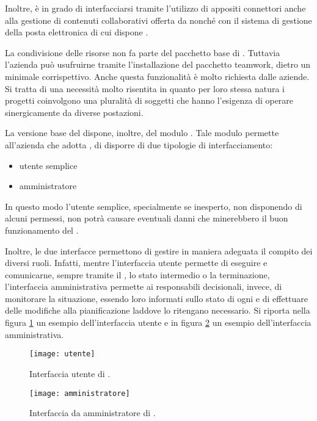 Inoltre, \progname è in grado di interfacciarsi tramite l'utilizzo di appositi connettori anche alla gestione di contenuti collaborativi offerta da  nonché con il sistema di gestione della posta elettronica  di cui dispone \customer.

La condivisione delle risorse non fa parte del pacchetto base di \progname. Tuttavia l'azienda può usufruirne tramite l'installazione del pacchetto \textsf{teamwork}, dietro un minimale corrispettivo. Anche questa funzionalità è molto richiesta dalle aziende. Si tratta di una necessità molto risentita in quanto per loro stessa natura i progetti coinvolgono una pluralità di soggetti che hanno l'esigenza di  operare sinergicamente da diverse postazioni.

La versione base del \sw dispone, inoltre, del modulo . Tale modulo permette all'azienda che adotta , di disporre di due tipologie di interfacciamento:
\begin{itemize}
 \item utente semplice
 \item amministratore
\end{itemize}

In questo modo l'utente semplice, specialmente se inesperto, non disponendo di alcuni permessi, non potrà causare eventuali danni che minerebbero il buon funzionamento del \sw.

Inoltre, le due interfacce permettono di gestire in maniera adeguata il compito dei diversi ruoli. Infatti, mentre l'interfaccia utente permette di eseguire  e comunicarne, sempre tramite il \sw, lo stato intermedio o la terminazione, l'interfaccia amministrativa permette ai responsabili decisionali, invece, di monitorare la situazione, essendo loro informati sullo stato di ogni  e di effettuare delle modifiche alla pianificazione laddove lo ritengano necessario.
Si riporta nella figura \ref{fig:utente} un esempio dell'interfaccia utente e in figura \ref{fig:amministratore} un esempio dell'interfaccia amministrativa.
\begin{figure}[H]
  \centering
  \texttt{[image: utente]}
  \caption{Interfaccia utente di \progname.}
  \label{fig:utente}
\end{figure}

\begin{figure}[H]
  \centering
  \texttt{[image: amministratore]}
  \caption{Interfaccia da amministratore di \progname.}
  \label{fig:amministratore}
\end{figure}

